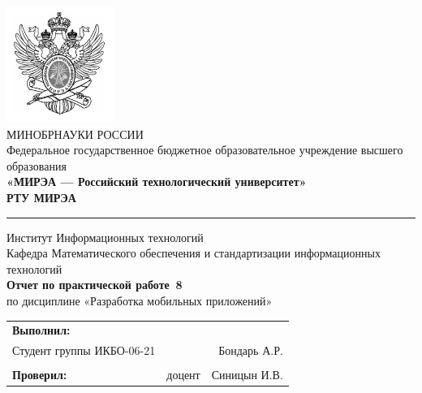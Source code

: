 \begin{titlepage}
	
	\thispagestyle{fancy}
	\renewcommand{\headrulewidth}{0pt}
	\setlength{\headheight}{17.0pt}

	\begin{center}
		\includegraphics[scale=0.5]{./res/logo}\\ %
		МИНОБРНАУКИ РОССИИ\\
		Федеральное государственное бюджетное образовательное
		учреждение высшего образования\\
		\textbf{«МИРЭА --- Российский технологический университет»}\\
		\textbf{\large РТУ МИРЭА}\\
		\bigskip \hrule \smallskip
		Институт Информационных технологий\\
		\vfill
		Кафедра Математического обеспечения и стандартизации
		информационных технологий\\
		\vfill
		\textbf{\large Отчет по практической работе \No\,8}\\
		по дисциплине «Разработка мобильных приложений»\\
		\vfill
		\vfill
		\begin{tabular}{lrr}
			\textbf{Выполнил:} & &\\
			Студент группы ИКБО-06-21 & & Бондарь А.Р. \\\\
			\textbf{Проверил:} &  доцент & Синицын И.В. \\
		\end{tabular}
		\vfill
	\end{center}
\end{titlepage}
\setcounter{page}{2}
\clearpage

